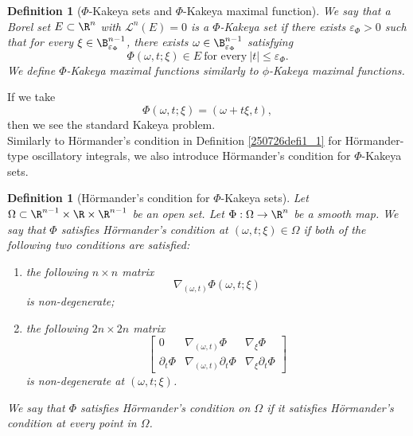 \documentclass{article}
\numberwithin{equation}{section}
\theoremstyle{plain}
\newtheorem{definition}[theorem]{Definition}
\begin{document}
	\begin{definition}[$\Phi$-Kakeya sets and $\Phi$-Kakeya maximal function]\label{260309defi1_8}
		We say that a Borel set $E\subset\R^n$ with $\mathcal{L}^n(E)=0$ is a $\Phi$-Kakeya set if there exists $\varepsilon_{\Phi}>0$ such that for every $\xi\in \B_{\varepsilon_{\Phi}}^{n-1}$, there exists $\omega\in \B_{\varepsilon_{\Phi}}^{n-1}$ satisfying 
		\begin{equation}
			\Phi(\omega, t; \xi)\in E\ \text{for every}\ |t|\le \varepsilon_{\Phi}.
		\end{equation}
We define $\Phi$-Kakeya maximal functions similarly to $\phi$-Kakeya maximal functions. 
	\end{definition}
	
	
	
If we take  
\begin{equation}\label{250709e1_15}
\Phi(\omega, t; \xi)= (\omega+t\xi, t),
\end{equation}
then we see the standard Kakeya problem. \\
	
	
	
Similarly to H\"ormander's condition in Definition \ref{250726defi1_1} for H\"ormander-type oscillatory integrals, we also introduce H\"ormander's condition for $\Phi$-Kakeya sets. 
	\begin{definition}[H\"ormander's condition for $\Phi$-Kakeya sets]\label{HorCond}
		Let $\Omega\subset \R^{n-1}\times \R\times \R^{n-1}$ be an open set. 
		Let $\Phi: \Omega\to \R^n$ be a smooth map. We say that $\Phi$ satisfies H\"ormander's condition at $(\omega, t; \xi)\in \Omega$ if both of the following two conditions are satisfied: 
		\begin{enumerate}
			\item[(1)] the following $n\times n$ matrix
			\begin{equation}\label{le1.1}
				\nabla_{(\omega, t)} \Phi(\omega, t; \xi) 
			\end{equation}
			is non-degenerate; 
			\item[(2)] the following $2n\times 2n$ matrix 
			\begin{equation}\label{le1.2}
				\begin{bmatrix}
					0 & \nabla_{(\omega, t)}\Phi & \nabla_{\xi}\Phi\\
					\partial_t \Phi & \nabla_{(\omega, t)}\partial_t \Phi & \nabla_{\xi}\partial_t\Phi
				\end{bmatrix}
			\end{equation}
			is non-degenerate at $(\omega, t; \xi)$. 
		\end{enumerate}
		We say that $\Phi$ satisfies H\"ormander's condition on $\Omega$ if it satisfies H\"ormander's condition at every point in $\Omega$. 
	\end{definition}
	
\end{document}
